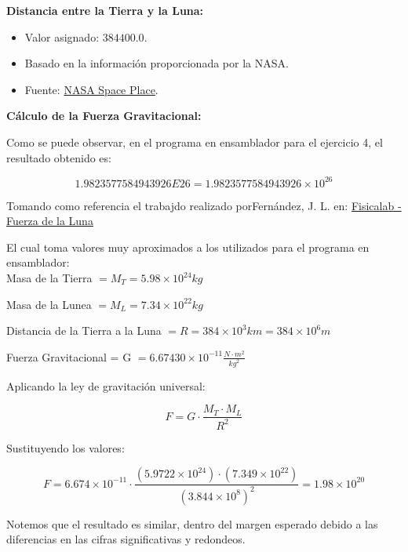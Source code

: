 \documentclass[12pt,letterpaper]{article}
\begin{document}
\textbf{Distancia entre la Tierra y la Luna:}

\begin{itemize}
\item Valor asignado: $384400.0$.
  
\item Basado en la información proporcionada por la NASA.
  
\item Fuente: \href{https://spaceplace.nasa.gov/moon-distance/sp/}{NASA Space Place}.
\end{itemize}

\textbf{Cálculo de la Fuerza Gravitacional:}

Como se puede observar, en el programa en ensamblador para el ejercicio 4, el resultado obtenido es:

\begin{equation}
  1.9823577584943926E26 = 1.9823577584943926 \times 10^{26}
\end{equation}

Tomando como referencia el trabajdo realizado porFernández, J. L. en: \href{https://www.fisicalab.com/ejercicio/898}{Fisicalab - Fuerza de la Luna}

El cual toma valores muy aproximados a los utilizados para el programa en ensamblador:\\

Masa de la Tierra $= M_T = 5.98 \times 10^{24} kg$

Masa de la Lunea $= M_L = 7.34 \times 10^{22} kg$

Distancia de la Tierra a la Luna $= R = 384 \times 10^3 km = 384 \times 10^6 m$

Fuerza Gravitacional = G $= 6.67430 \times 10^{-11} \frac{N \cdot m^2}{kg^2}$

Aplicando la ley de gravitación universal:

\begin{equation}
    F = G \cdot \frac{M_T \cdot M_L}{R^2}
\end{equation}

Sustituyendo los valores:

\begin{equation}
    F = 6.674 \times 10^{-11} \cdot \frac{(5.9722 \times 10^{24}) \cdot (7.349 \times 10^{22})}{(3.844 \times 10^{8})^2} = 1.98 \times 10^{20}
\end{equation}

Notemos que el resultado es similar, dentro del margen esperado debido a las diferencias en las cifras significativas y redondeos.
\end{document}

